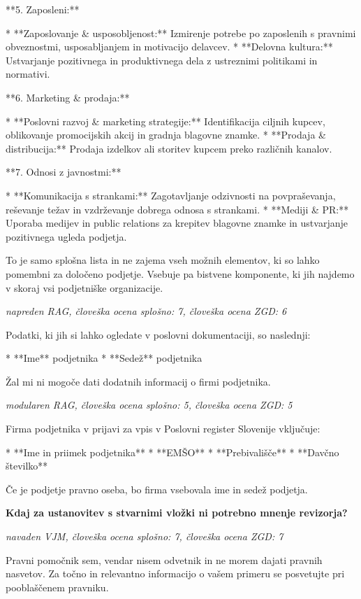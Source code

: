 \documentclass[a4paper,12pt,openright]{book}
\begin{document}
**5. Zaposleni:**

* **Zaposlovanje \& usposobljenost:** Izmirenje potrebe po zaposlenih s pravnimi obveznostmi, usposabljanjem in motivacijo delavcev.
* **Delovna kultura:** Ustvarjanje pozitivnega in produktivnega dela z ustreznimi politikami in normativi.

**6. Marketing \& prodaja:**

* **Poslovni razvoj \& marketing strategije:**  Identifikacija ciljnih kupcev, oblikovanje promocijskih akcij in gradnja blagovne znamke.
* **Prodaja \& distribucija:** Prodaja izdelkov ali storitev kupcem preko različnih kanalov.

**7. Odnosi z javnostmi:**

* **Komunikacija s strankami:** Zagotavljanje odzivnosti na povpraševanja, reševanje težav in vzdrževanje dobrega odnosa s strankami.
* **Mediji \& PR:** Uporaba medijev in public relations za krepitev blagovne znamke in ustvarjanje pozitivnega ugleda podjetja.


To je samo splošna lista in ne zajema vseh možnih elementov, ki so lahko pomembni za določeno podjetje. Vsebuje pa bistvene komponente, ki jih najdemo v skoraj vsi podjetniške organizacije.

\vspace{0.5cm}
\textit{napreden RAG, človeška ocena splošno: 7, človeška ocena ZGD: 6}

Podatki, ki jih si lahko ogledate v poslovni dokumentaciji, so naslednji:

* **Ime** podjetnika
* **Sedež** podjetnika


  Žal mi ni mogoče dati dodatnih informacij o firmi podjetnika.

\vspace{0.5cm}
\textit{modularen RAG, človeška ocena splošno: 5, človeška ocena ZGD: 5}

Firma podjetnika v prijavi za vpis v Poslovni register Slovenije vključuje:

* **Ime in priimek podjetnika**
* **EMŠO**
* **Prebivališče**
* **Davčno številko**


Če je podjetje pravno oseba, bo firma vsebovala ime in sedež podjetja.

\vspace{0.5cm}
\textbf{Kdaj za ustanovitev s stvarnimi vložki ni potrebno mnenje revizorja?}

\textit{navaden VJM, človeška ocena splošno: 7, človeška ocena ZGD: 7}

Pravni pomočnik sem, vendar nisem odvetnik in ne morem dajati pravnih nasvetov. Za točno in relevantno informacijo o vašem primeru se posvetujte pri pooblaščenem pravniku.
\end{document}

